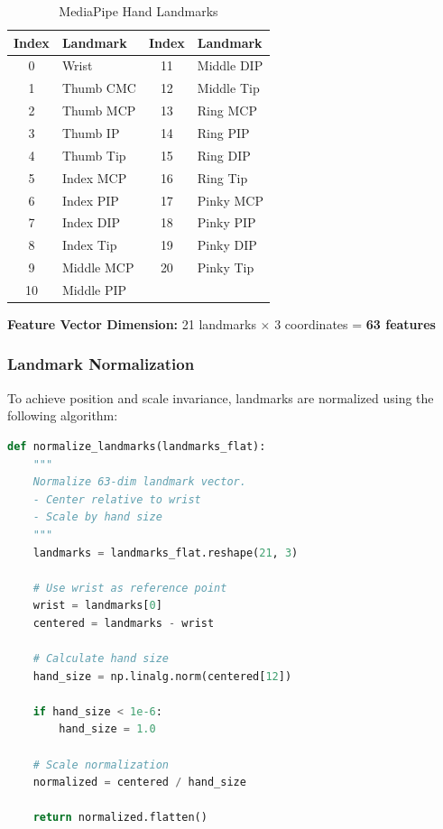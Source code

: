 \documentclass[conference]{IEEEtran}
\begin{document}
\begin{table}[htbp]
\caption{MediaPipe Hand Landmarks}
\label{tab:landmarks}
\centering
\begin{tabular}{|c|l|c|l|}
\hline
\textbf{Index} & \textbf{Landmark} & \textbf{Index} & \textbf{Landmark} \\
\hline
0 & Wrist & 11 & Middle DIP \\
1 & Thumb CMC & 12 & Middle Tip \\
2 & Thumb MCP & 13 & Ring MCP \\
3 & Thumb IP & 14 & Ring PIP \\
4 & Thumb Tip & 15 & Ring DIP \\
5 & Index MCP & 16 & Ring Tip \\
6 & Index PIP & 17 & Pinky MCP \\
7 & Index DIP & 18 & Pinky PIP \\
8 & Index Tip & 19 & Pinky DIP \\
9 & Middle MCP & 20 & Pinky Tip \\
10 & Middle PIP & & \\
\hline
\end{tabular}
\end{table}

\textbf{Feature Vector Dimension:} 21 landmarks $\times$ 3 coordinates = \textbf{63 features}

\subsubsection{Landmark Normalization}

To achieve position and scale invariance, landmarks are normalized using the following algorithm:

\begin{lstlisting}[language=Python, caption={Landmark Normalization Algorithm}]
def normalize_landmarks(landmarks_flat):
    """
    Normalize 63-dim landmark vector.
    - Center relative to wrist
    - Scale by hand size
    """
    landmarks = landmarks_flat.reshape(21, 3)
    
    # Use wrist as reference point
    wrist = landmarks[0]
    centered = landmarks - wrist
    
    # Calculate hand size
    hand_size = np.linalg.norm(centered[12])
    
    if hand_size < 1e-6:
        hand_size = 1.0
    
    # Scale normalization
    normalized = centered / hand_size
    
    return normalized.flatten()
\end{lstlisting}
\end{document}
